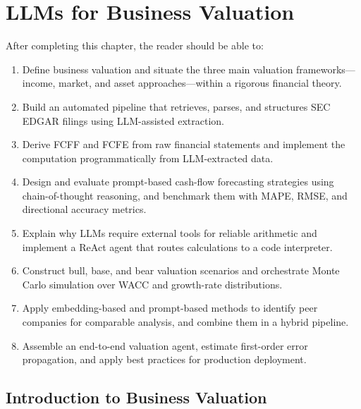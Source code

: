 \chapter{LLMs for Business Valuation}
\label{ch:business-valuation}

\begin{remark}
After completing this chapter, the reader should be able to:
\begin{enumerate}
  \item Define business valuation and situate the three main valuation frameworks---income,
        market, and asset approaches---within a rigorous financial theory.
  \item Build an automated pipeline that retrieves, parses, and structures SEC EDGAR
        filings using LLM-assisted extraction.
  \item Derive FCFF and FCFE from raw financial statements and implement the computation
        programmatically from LLM-extracted data.
  \item Design and evaluate prompt-based cash-flow forecasting strategies using
        chain-of-thought reasoning, and benchmark them with MAPE, RMSE, and directional
        accuracy metrics.
  \item Explain why LLMs require external tools for reliable arithmetic and implement a
        ReAct agent that routes calculations to a code interpreter.
  \item Construct bull, base, and bear valuation scenarios and orchestrate Monte Carlo
        simulation over WACC and growth-rate distributions.
  \item Apply embedding-based and prompt-based methods to identify peer companies for
        comparable analysis, and combine them in a hybrid pipeline.
  \item Assemble an end-to-end valuation agent, estimate first-order error propagation,
        and apply best practices for production deployment.
\end{enumerate}
\end{remark}


\section{Introduction to Business Valuation}
\label{sec:bv-intro}

